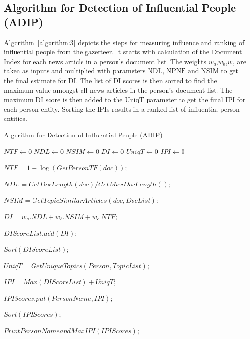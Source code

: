 \subsection{Algorithm for Detection of Influential People (ADIP)}

Algorithm~\ref{algorithm:3} depicts the steps for measuring influence and ranking of influential people from the gazetteer. It starts with calculation of the Document Index for each news article in a person's document list. The weights $w_a$,$w_b$,$w_c$ are taken as inputs and multiplied with parameters $\text{NDL, NPNF and NSIM}$  to get the final estimate for DI. The list of DI scores is then sorted to find the maximum value amongst all news articles in the person's document list. The maximum DI score is then added to the UniqT parameter to get the final IPI for each person entity. Sorting the IPIs results in a ranked list of influential person entities.  


\begin{algorithm*}[!th]
\caption{Algorithm for Detection of Influential People (ADIP)}
\label{algorithm:3}
\begin{algorithmic}
  

 $NTF \leftarrow $0
 $NDL \leftarrow $0
 $NSIM \leftarrow $0
 $DI\leftarrow $0
 $UniqT\leftarrow $0
 $IPI\leftarrow $0\;  
  
     {
	{	
		$NTF=1+\log (GetPersonTF(doc))$;
		
$NDL=GetDocLength(doc)/GetMaxDocLength()$;

		$ NSIM=GetTopicSimilarArticles(doc,DocList)$;

		$DI=w_a . NDL+w_b . NSIM+ w_c . NTF$;
		
		$DIScoreList.add(DI)$;
 	 }
		$Sort(DIScoreList)$;

		$UniqT=GetUniqueTopics(Person,TopicList)$;

		$IPI=Max(DIScoreList)+UniqT$;

		$IPIScores.put(PersonName,IPI)$;
       }
	$Sort(IPIScores)$;

	$PrintPersonNameandMaxIPI(IPIScores)$;

\EndFunction
\end{algorithmic}
\end{algorithm*}

